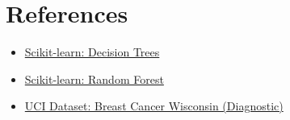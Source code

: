 \documentclass[11pt]{article}
\begin{document}

\section*{References}
\begin{itemize}
    \item \href{https://scikit-learn.org/stable/modules/tree.html}{Scikit-learn: Decision Trees}
    \item \href{https://scikit-learn.org/stable/modules/ensemble.html}{Scikit-learn: Random Forest}
    \item \href{https://archive.ics.uci.edu/dataset/17/breast+cancer+wisconsin+diagnostic}{UCI Dataset: Breast Cancer Wisconsin (Diagnostic)}
\end{itemize}
\end{document}
